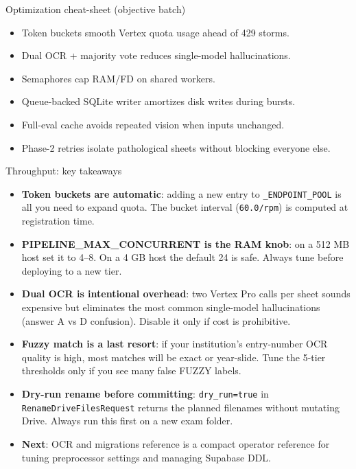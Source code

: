\documentclass[aspectratio=169]{beamer}
\begin{document}
\begin{frame}{Optimization cheat-sheet (objective batch)}
  \small
  \begin{itemize}
    \item Token buckets smooth Vertex quota usage ahead of 429 storms.
    \item Dual OCR + majority vote reduces single-model hallucinations.
    \item Semaphores cap RAM/FD on shared workers.
    \item Queue-backed SQLite writer amortizes disk writes during bursts.
    \item Full-eval cache avoids repeated vision when inputs unchanged.
    \item Phase-2 retries isolate pathological sheets without blocking everyone else.
  \end{itemize}
\end{frame}

\begin{frame}{Throughput: key takeaways}
  \small
  \begin{itemize}\setlength\itemsep{0.3em}
    \item \textbf{Token buckets are automatic}: adding a new entry to \texttt{\_ENDPOINT\_POOL} is all you need to expand quota. The bucket interval (\texttt{60.0/rpm}) is computed at registration time.
    \item \textbf{PIPELINE\_MAX\_CONCURRENT is the RAM knob}: on a 512 MB host set it to 4--8. On a 4 GB host the default 24 is safe. Always tune before deploying to a new tier.
    \item \textbf{Dual OCR is intentional overhead}: two Vertex Pro calls per sheet sounds expensive but eliminates the most common single-model hallucinations (answer A vs D confusion). Disable it only if cost is prohibitive.
    \item \textbf{Fuzzy match is a last resort}: if your institution's entry-number OCR quality is high, most matches will be exact or year-slide. Tune the 5-tier thresholds only if you see many false FUZZY labels.
    \item \textbf{Dry-run rename before committing}: \texttt{dry\_run=true} in \texttt{RenameDriveFilesRequest} returns the planned filenames without mutating Drive. Always run this first on a new exam folder.
    \item \textbf{Next}: OCR and migrations reference is a compact operator reference for tuning preprocessor settings and managing Supabase DDL.
  \end{itemize}
\end{frame}
\end{document}
